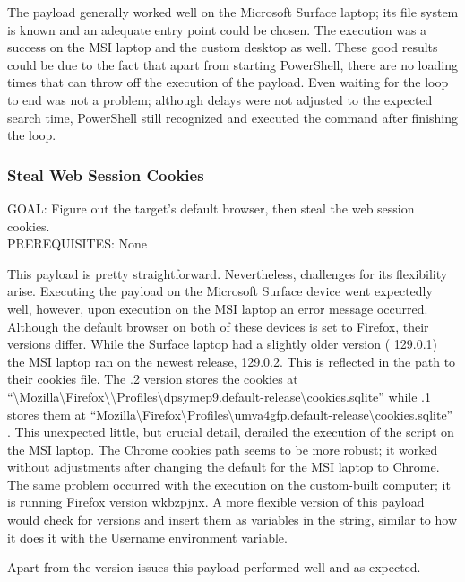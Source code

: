 The payload generally worked well on the Microsoft Surface laptop; its file system is known and an adequate entry point could be chosen. The execution was a success on the MSI laptop and the custom desktop as well. These good results could be due to the fact that apart from starting PowerShell, there are no loading times that can throw off the execution of the payload. Even waiting for the loop to end was not a problem; although delays were not adjusted to the expected search time, PowerShell still recognized and executed the command after finishing the loop.



\subsubsection{Steal Web Session Cookies}

GOAL: Figure out the target's default browser, then steal the web session cookies. \\
PREREQUISITES: None

This payload is pretty straightforward. Nevertheless, challenges for its flexibility arise. Executing the payload on the Microsoft Surface device went expectedly well, however, upon execution on the MSI laptop an error message occurred. Although the default browser on both of these devices is set to Firefox, their versions differ. While the Surface laptop had a slightly older version ( 129.0.1) the MSI laptop ran on the newest release, 129.0.2. This is reflected in the path to their cookies file. The .2 version stores the cookies at ``\textbackslash Mozilla\textbackslash Firefox\textbackslash \textbackslash Profiles\textbackslash dpsymep9.default-release\textbackslash cookies.sqlite''  while .1 stores them at ``Mozilla\textbackslash Firefox\textbackslash Profiles\textbackslash umva4gfp.default-release\textbackslash cookies.sqlite'' . This unexpected little, but crucial detail, derailed the execution of the script on the MSI laptop. The Chrome cookies path seems to be more robust; it worked without adjustments after changing the default for the MSI laptop to Chrome. The same problem occurred with the execution on the custom-built computer; it is running Firefox version wkbzpjnx. A more flexible version of this payload would check for versions and insert them as variables in the string, similar to how it does it with the Username environment variable. 

Apart from the version issues this payload performed well and as expected. 


